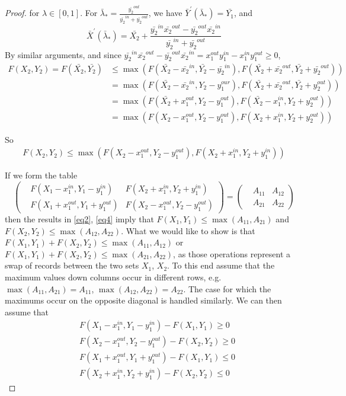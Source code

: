 \documentclass{article}
\theoremstyle{case}
\begin{document}
\begin{proof}
for $\lambda \in \left[ 0,1\right]$. For $\bar{\lambda}_{*} = \frac{\bar{y_2}^{out}}{\bar{y_2}^{in} + \bar{y_2}^{out}}$, we have $\bar{Y}^\prime\left( \bar{\lambda}_{*}\right) = \bar{Y_1}$, and 
\[\bar{X}^\prime\left( \bar{\lambda}_{*}\right) = \bar{X_2} + \frac{\bar{y_2}^{in}\bar{x_2}^{out}-\bar{y_2}^{out}\bar{x_2}^{in}}{\bar{y_2}^{in} + \bar{y_2}^{out}}\]
By similar arguments, and since $\bar{y_2}^{in}\bar{x_2}^{out}-\bar{y_2}^{out}\bar{x_2}^{in} = x_1^{out}y_1^{in} - x_1^{in}y_1^{out} \geq 0$, 
\begin{align*}
F(X_2, Y_2) = F(\bar{X_2}, \bar{Y_2}) & \leq \max{\left(F(\bar{X_2}-\bar{x_2}^{in},\bar{Y_2}-\bar{y_2}^{in}), F(\bar{X_2}+\bar{x_2}^{out},\bar{Y_2}+\bar{y_2}^{out})\right)} \\
& = \max{\left(F(\bar{X_2}-\bar{x_2}^{in},Y_2-y_1^{our}), F(\bar{X_2}+\bar{x_2}^{out},\bar{Y_2}+y_2^{out})\right)} \\
& = \max{\left(F(\bar{X_2} +x_1^{out},Y_2-y_1^{out}), F(\bar{X_2}-x_1^{in},Y_2+y_2^{out})\right)} \\
& = \max{\left(F(X_2 -x_1^{out},Y_2-y_1^{out}), F(X_2+x_1^{in},Y_2+y_2^{out})\right)}
\end{align*}

So
\begin{align} \label{eq4}
F(X_2, Y_2) \leq \max{\left(F(X_2-x_1^{out},Y_2-y_1^{out}), F(X_2+x_1^{in},Y_2+y_1^{in})\right)}
\end{align}

If we form the table
\[
\begin{pmatrix}
&F(X_1 - x_1^{in}, Y_1 - y_1^{in}) & F(X_2 + x_1^{in}, Y_2 + y_1^{in}) \\
&F(X_1 + x_1^{out}, Y_1 + y_1^{out}) & F(X_2 - x_1^{out}, Y_2 - y_1^{out})
\end{pmatrix} = \begin{pmatrix}
&A_{11} & A_{12} \\
&A_{21} & A_{22}
\end{pmatrix}
\]
then the results in \ref{eq2}, \ref{eq4} imply that $F(X_1, Y_1) \leq \max{\left(A_{11}, A_{21}\right)}$ and $F(X_2, Y_2) \leq \max{\left(A_{12}, A_{22}\right)}$. What we would like to show is that $F(X_1, Y_1) + F(X_2, Y_2) \leq \max{\left(A_{11}, A_{12}\right)}$ or $F(X_1, Y_1) + F(X_2, Y_2) \leq \max{\left(A_{21}, A_{22}\right)}$, as those operations represent a swap of records between the two sets $X_1$, $X_2$. To this end assume that the maximum values down columns occur in different rows, e.g. $\max{\left(A_{11}, A_{21}\right)} = A_{11}$, $\max{\left(A_{12}, A_{22}\right)} = A_{22}$. The case for which the maximums occur on the opposite diagonal is handled similarly. We can then assume that 
\begin{align}
& F(X_1 - x_1^{in}, Y_1 - y_1^{in}) - F(X_1, Y_1) \geq 0 \\
& F(X_2 - x_1^{out}, Y_2 - y_1^{out}) - F(X_2, Y_2) \geq 0 \\
& F(X_1 + x_1^{out}, Y_1 + y_1^{out}) - F(X_1, Y_1) \leq 0 \\
& F(X_2 + x_1^{in}, Y_2 + y_1^{in}) - F(X_2, Y_2) \leq 0
\end{align}


\end{proof}
\end{document}
